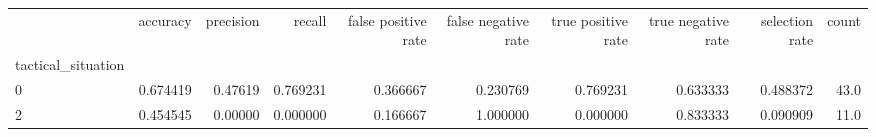 \begin{tabular}{lrrrrrrrrr}
\toprule
{} &  accuracy &  precision &    recall &  false positive rate &  false negative rate &  true positive rate &  true negative rate &  selection rate &  count \\
tactical\_situation &           &            &           &                      &                      &                     &                     &                 &        \\
\midrule
0                  &  0.674419 &    0.47619 &  0.769231 &             0.366667 &             0.230769 &            0.769231 &            0.633333 &        0.488372 &   43.0 \\
2                  &  0.454545 &    0.00000 &  0.000000 &             0.166667 &             1.000000 &            0.000000 &            0.833333 &        0.090909 &   11.0 \\
\bottomrule
\end{tabular}
